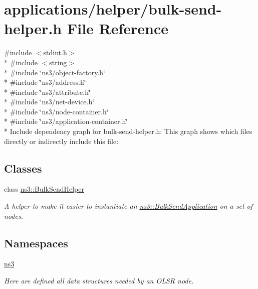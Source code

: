 \hypertarget{bulk-send-helper_8h}{}\section{applications/helper/bulk-\/send-\/helper.h File Reference}
\label{bulk-send-helper_8h}
{\ttfamily \#include $<$stdint.\+h$>$}\\*
{\ttfamily \#include $<$string$>$}\\*
{\ttfamily \#include \char`\"{}ns3/object-\/factory.\+h\char`\"{}}\\*
{\ttfamily \#include \char`\"{}ns3/address.\+h\char`\"{}}\\*
{\ttfamily \#include \char`\"{}ns3/attribute.\+h\char`\"{}}\\*
{\ttfamily \#include \char`\"{}ns3/net-\/device.\+h\char`\"{}}\\*
{\ttfamily \#include \char`\"{}ns3/node-\/container.\+h\char`\"{}}\\*
{\ttfamily \#include \char`\"{}ns3/application-\/container.\+h\char`\"{}}\\*
Include dependency graph for bulk-\/send-\/helper.h\+:
This graph shows which files directly or indirectly include this file\+:
\subsection*{Classes}
\begin{DoxyCompactItemize}
\item 
class \hyperlink{classns3_1_1BulkSendHelper}{ns3\+::\+Bulk\+Send\+Helper}
\begin{DoxyCompactList}\small\item\em A helper to make it easier to instantiate an \hyperlink{classns3_1_1BulkSendApplication}{ns3\+::\+Bulk\+Send\+Application} on a set of nodes. \end{DoxyCompactList}\end{DoxyCompactItemize}
\subsection*{Namespaces}
\begin{DoxyCompactItemize}
\item 
 \hyperlink{namespacens3}{ns3}
\begin{DoxyCompactList}\small\item\em Here are defined all data structures needed by an O\+L\+SR node. \end{DoxyCompactList}\end{DoxyCompactItemize}
